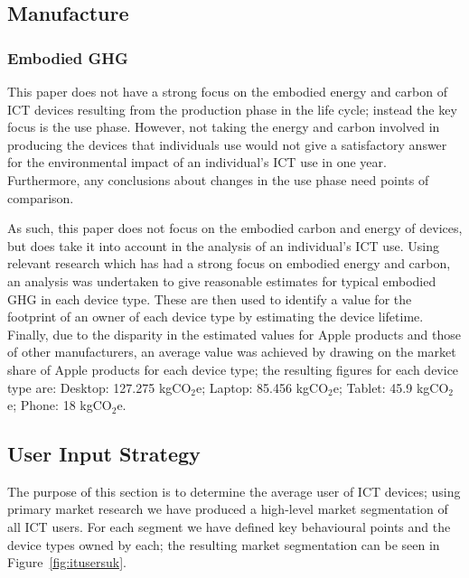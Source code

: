 \documentclass[conference]{IEEEtran}
\begin{document}
\subsection{Manufacture}

\subsubsection{Embodied GHG}

This paper does not have a strong focus on the embodied energy and
carbon of ICT devices resulting from the production phase in the life
cycle; instead the key focus is the use phase. However, not taking the
energy and carbon involved in producing the devices that individuals
use would not give a satisfactory answer for the environmental impact
of an individual's ICT use in one year. Furthermore, any conclusions
about changes in the use phase need points of comparison.

As such, this paper does not focus on the
embodied carbon and energy of devices, but does take it into account
in the analysis of an individual's ICT use. Using relevant
research which has had a strong focus on embodied energy and carbon,
an analysis was undertaken to give reasonable estimates for typical
embodied GHG in each device type. These are then used to identify a
value for the footprint of an owner of each device type by estimating
the device lifetime. Finally, due to the disparity in the estimated
values for Apple products and those of other manufacturers, an average
value was achieved by drawing on the market share of Apple products
for each device type; the resulting figures for each device type
are: Desktop: 127.275 kgCO$_2$e; Laptop: 85.456 kgCO$_2$e; Tablet:
45.9 kgCO$_2$e; Phone: 18 kgCO$_2$e.

\subsection{User Input Strategy}

The purpose of this section is to determine the average user of ICT
devices; using primary market research we have produced a high-level
market segmentation of all ICT users. For each segment we have defined
key behavioural points and the device types owned by each; the
resulting market segmentation can be seen in
Figure~\ref{fig:itusersuk}.
\end{document}
